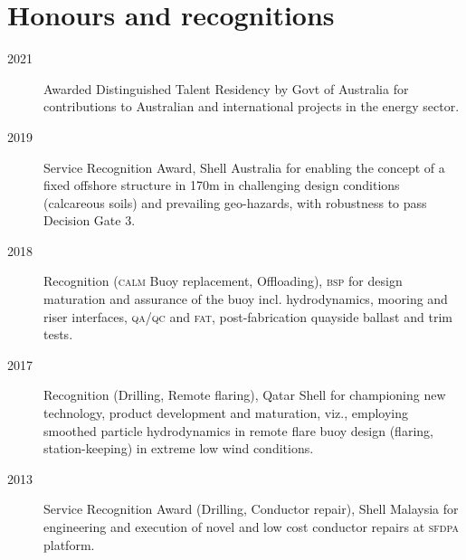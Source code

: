 \section*{Honours and recognitions} %
\label{sec:hon}

\begin{description}
\item[2021]Awarded Distinguished Talent Residency by Govt of Australia for contributions to Australian and international projects in the energy sector.

\item[2019]Service Recognition Award, Shell Australia for enabling the concept of a fixed offshore structure in 170m in challenging design conditions (calcareous soils) and prevailing geo-hazards, with robustness to pass Decision Gate 3.

\item[2018]Recognition (\textsc{calm} Buoy replacement, Offloading), \textsc{bsp} for design maturation and assurance of the buoy incl. hydrodynamics, mooring and riser interfaces, \textsc{qa}/\textsc{qc} and \textsc{fat}, post-fabrication quayside ballast and trim tests.

\item[2017]Recognition (Drilling, Remote flaring), Qatar Shell for championing new technology, product development and maturation, viz., employing smoothed particle hydrodynamics in remote flare buoy design (flaring, station-keeping) in extreme low wind conditions.


\item[2013]Service Recognition Award (Drilling, Conductor repair), Shell Malaysia for engineering and execution of novel and low cost conductor repairs at \textsc{sfdpa} platform.



\end{description}

